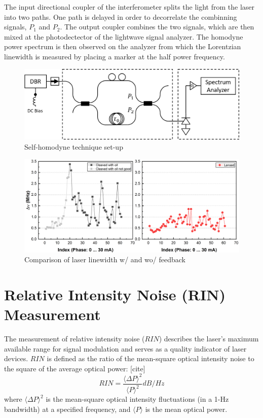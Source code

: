 The input directional coupler of the interferometer splits the light from the laser into two paths. One path is delayed in order to decorrelate the combinning signals, $P_1$ and $P_2$. The output coupler combines the two signals, which are then mixed at the photodectector of the lightwave signal analyzer.  The homodyne power spectrum is then observed on the analyzer from which the Lorentzian linewidth is measured by placing a marker at the half power frequency.
\begin{figure}[ht]
    \centering
    \includegraphics[width=.7\linewidth]{figures/self-homodyne_setup.png}
    \caption{Self-homodyne technique set-up}
    \label{self-homodyne_setup}
\end{figure}

\begin{figure}[ht]
    \centering
    \includegraphics[width=\linewidth]{figures/LB_Cleaved_and_Lensed.png}
    \caption{Comparison of laser linewidth w/ and wo/ feedback}
    \label{fig:LB_Cleaved_and_Lensed}
\end{figure}

\section{Relative Intensity Noise (RIN) Measurement}\label{sec:RIN_measurement}
The measurement of relative intensity noise ($RIN$) describes the laser’s maximum available range for signal modulation and serves as a quality indicator of laser devices. $RIN$ is defined as the ratio of the mean-square optical intensity noise to the square of the average optical power: [cite]
\begin{equation}
    RIN=\frac{\langle \Delta P \rangle ^2}{\langle P \rangle ^2}dB/Hz
\label{RIN_1}
\end{equation}
where $\langle \Delta P \rangle ^2$ is the mean-square optical intensity fluctuations (in a 1-Hz bandwidth) at a specified frequency, and $\langle P \rangle$ is the mean optical power.

